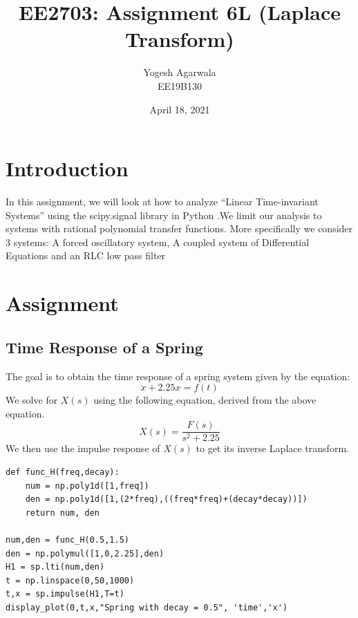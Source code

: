 \documentclass{article}
\title{EE2703: Assignment 6L (Laplace Transform)}
\author{Yogesh Agarwala \\ EE19B130}
\date{April 18, 2021}
\begin{document}
\maketitle

\section{Introduction}
In this assignment, we will look at how to analyze “Linear Time-invariant Systems” using the scipy.signal library in Python .We limit our analysis to systems with rational polynomial transfer functions. More specifically we consider 3 systems: A forced oscillatory system, A coupled system of Differential Equations and an RLC low pass filter  

\section{Assignment}
\subsection{Time Response of a Spring}
The goal is to obtain the time response of a spring system given by the
equation:
\begin{equation}
    \ddot x + 2.25x = f(t)
\end{equation}
We solve for $X(s)$ using the following equation, derived from the above equation.
\begin{equation}
    X(s) = \frac{F(s)}{s^2+2.25}
\end{equation}
We then use the impulse response of $X(s)$ to get its inverse Laplace transform.

\lstset{language=Python}
\lstset{frame=lines}
\lstset{basicstyle=\footnotesize}
\begin{lstlisting}
def func_H(freq,decay):
	num = np.poly1d([1,freq])
	den = np.poly1d([1,(2*freq),((freq*freq)+(decay*decay))])
	return num, den

num,den = func_H(0.5,1.5)
den = np.polymul([1,0,2.25],den)
H1 = sp.lti(num,den)
t = np.linspace(0,50,1000)
t,x = sp.impulse(H1,T=t)
display_plot(0,t,x,"Spring with decay = 0.5", 'time','x')
\end{lstlisting}
\end{document}
